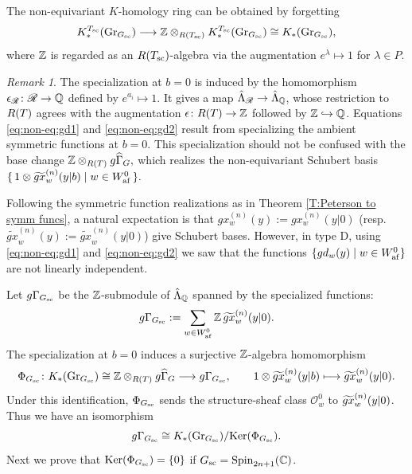 \documentclass[a4paper]{amsart}
\newcommand{\ike}[1]{\todo[size=\tiny,color=blue!30]{#1}}
\newcommand{\smark}[1]{\todo[size=\tiny,color=cyan!30]{#1}}
\theoremstyle{remark}
\newtheorem{remark}[thm]{Remark}
\numberwithin{equation}{section}
\begin{document}
The non-equivariant $K$-homology ring can be obtained by forgetting
\[
K_*^{\Tsc}(\Gr_{\Gsc})
\longrightarrow
\Z\otimes_{\Rsc}K_*^{\Tsc}(\Gr_{\Gsc})
\cong K_*(\Gr_{\Gsc}),
\]
where $\Z$ is regarded as an $\Rsc$-algebra via the augmentation
$e^\lambda\mapsto 1$ for $\lambda\in P$.
\begin{remark}
The specialization at $b=0$ is induced by the homomorphism
$\epsilon_{\R}\colon\R\to\Q$ defined by $e^{a_i}\mapsto 1$.
It gives a map $\hL_{\R}\to\hL_{\Q}$, whose restriction
to $\RT$ agrees with the augmentation
$\epsilon\colon\RT\to\Z$ followed by $\Z\hookrightarrow\Q$.
Equations \eqref{eq:non-eq:gd1} and \eqref{eq:non-eq:gd2} result from specializing the ambient symmetric functions at $b=0$. {This specialization should not be confused} with the base change
$\Z\otimes_{R(T)}\gGhat_{G},
$ which realizes the non-equivariant Schubert basis
$\{\,1\otimes\tgx{w}{n}(y| b) \mid w\in W_{\af}^0\,\}.$
 \end{remark}


Following the symmetric function realizations as in Theorem \ref{T:Peterson to symm funcs},
a natural expectation is that $gx_w^{(n)}(y):=gx_w^{(n)}(y|0)$ (resp. $\widetilde{gx}_w^{(n)}(y):=\widetilde{gx}_w^{(n)}(y|0)$)
give Schubert bases. However, in type $\mathrm{D}$, using \eqref{eq:non-eq:gd1} and \eqref{eq:non-eq:gd2} we saw
that the functions $\{gd_w(y)\mid w\in \Wafgr\}$ are not 
linearly independent. 


Let $g\Gamma_{\Gsc}$ be the $\Z$-submodule of $\hL_{\Q}$
spanned by the specialized functions:
\[
g\Gamma_{\Gsc}
:=\sum_{w\in\Wafgr}\Z\,\tgx{w}{n}(y| 0).
\]
The specialization at $b=0$ induces a surjective
$\Z$-algebra homomorphism
\[
\Phi_{\Gsc}\colon
K_*(\Gr_{\Gsc})
\cong \Z\otimes_{\RT}\gGhat_{G}
\longrightarrow g\Gamma_{\Gsc},
\qquad
1\otimes\tgx{w}{n}(y| b)
\longmapsto \tgx{w}{n}(y| 0).
\]
Under this identification, $\Phi_{\Gsc}$ sends the structure-sheaf
class $\mathscr O_w^0$ to $\tgx{w}{n}(y| 0)$.
Thus we have an isomorphism 
$$g\Gamma_{\Gsc}\cong {K_*(\Gr_{\Gsc})}/{\Ker(\Phi_{\Gsc})}.$$
Next we prove that $\Ker(\Phi_{\Gsc})=\{0\}$ if $\Gsc=\Spin_{2n+1}(\C)$.
\end{document}
